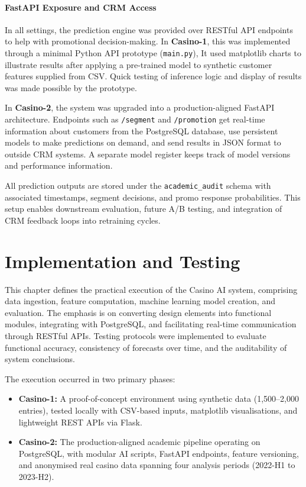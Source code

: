 \documentclass[12pt,a4paper]{report}
\begin{document}
\subsubsection*{FastAPI Exposure and CRM Access}

In all settings, the prediction engine was provided over RESTful API endpoints to help with promotional decision-making. In \textbf{Casino-1}, this was implemented through a  minimal Python API prototype (\texttt{main.py}), It used matplotlib charts to illustrate results after applying a pre-trained model to synthetic customer features supplied from CSV. Quick testing of inference logic and display of results was made possible by the prototype.

In \textbf{Casino-2}, the system was upgraded into a production-aligned FastAPI architecture. Endpoints such as \texttt{/segment} and \texttt{/promotion} get real-time information about customers from the PostgreSQL database, use persistent models to make predictions on demand, and send results in JSON format to outside CRM systems.  A separate model register keeps track of model versions and performance information.

All prediction outputs are stored under the \texttt{academic\_audit} schema with associated timestamps, segment decisions, and promo response probabilities. This setup enables downstream evaluation, future A/B testing, and integration of CRM feedback loops into retraining cycles.


\chapter{Implementation and Testing}

This chapter defines the practical execution of the Casino AI system, comprising data ingestion, feature computation, machine learning model creation, and evaluation.  The emphasis is on converting design elements into functional modules, integrating with PostgreSQL, and facilitating real-time communication through RESTful APIs.  Testing protocols were implemented to evaluate functional accuracy, consistency of forecasts over time, and the auditability of system conclusions.

The execution occurred in two primary phases:

\begin{itemize}
    \item \textbf{Casino-1:} A proof-of-concept environment using synthetic data (1,500–2,000 entries), tested locally with CSV-based inputs, matplotlib visualisations, and lightweight REST APIs via Flask.
    \item \textbf{Casino-2:} The production-aligned academic pipeline operating on PostgreSQL, with modular AI scripts, FastAPI endpoints, feature versioning, and anonymised real casino data spanning four analysis periods (2022-H1 to 2023-H2).
\end{itemize}
\end{document}
